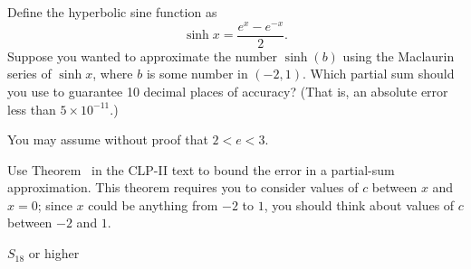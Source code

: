 \begin{question}
	Define the hyperbolic sine function as
	\[\sinh x = \frac{e^{x}-e^{-x}}{2}.\]
	Suppose you wanted to approximate the number $\sinh(b)$ using the Maclaurin series of $\sinh x$, where $b$ is some number in $(-2,1)$. Which partial sum should you use to guarantee 10 decimal places of accuracy?
	(That is, an absolute error less than $5\times10^{-11}$.)

	You may assume without proof that $2<e<3$.
\end{question}
\begin{hint}
	Use  Theorem~ in the CLP-II text to bound the error in a partial-sum approximation.
	This theorem requires you to consider values of $c$ between $x$ and $x=0$; since $x$ could be anything from $-2$ to $1$, you should think about values of $c$ between $-2$ and $1$.
\end{hint}
\begin{answer}
$S_{18}$ or higher
\end{answer}
